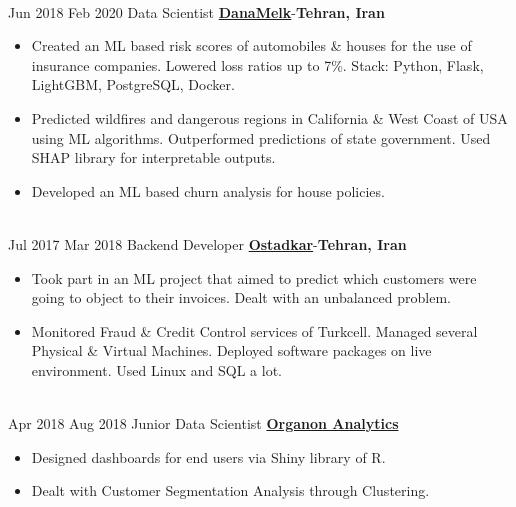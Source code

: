 \documentclass[letterpaper]{DS_class_file} %
\begin{document}
\begin{twenty}
{\begin{itemize}
                
		\end{itemize}}
		\\
	\twentyitem
		{Jun 2018}
		{Feb 2020}
		{\hspace{0.3cm}Data Scientist}
		{\href{https://www.linkedin.com/company/danamelk/people/}{\textbf{DanaMelk}}-\textbf{Tehran, Iran}}
		{}
		{\begin{itemize}
			\item Created an ML based risk scores of automobiles \& houses for the use of insurance companies. Lowered loss ratios up to 7\%. \newline Stack: Python, Flask, LightGBM, PostgreSQL, Docker.
			\item Predicted wildfires and dangerous regions in California \& West Coast of USA using ML algorithms. Outperformed predictions of state government. Used SHAP library for interpretable outputs.
			\item Developed an ML based churn analysis for house policies.
		\end{itemize}}
		\\
	\twentyitem
		{Jul 2017}
		{Mar 2018}
		{\hspace{0.3cm}Backend Developer}
		{\href{https://www.linkedin.com/company/ostadkar/about/}{\textbf{Ostadkar}}-\textbf{Tehran, Iran}}
		{}
		{\begin{itemize}
			\item Took part in an ML project that aimed to predict which customers were going to object to their invoices. Dealt with an unbalanced problem.
			\item Monitored Fraud \& Credit Control services of Turkcell. Managed several Physical \& Virtual Machines. Deployed software packages on live environment. Used Linux and SQL a lot.
		\end{itemize}}
		\\
	\twentyitem
		{Apr 2018}
		{Aug 2018}
		{\hspace{0.3cm}Junior Data Scientist}
		{\href{http://www.organonanalytics.com/pages/index.php}{\textbf{Organon Analytics}}}
		{}
		{\begin{itemize}
			\item Designed dashboards for end users via Shiny library of R.
			\item Dealt with Customer Segmentation Analysis through Clustering.
		\end{itemize}}
		\\
\end{twenty}
\end{document}
